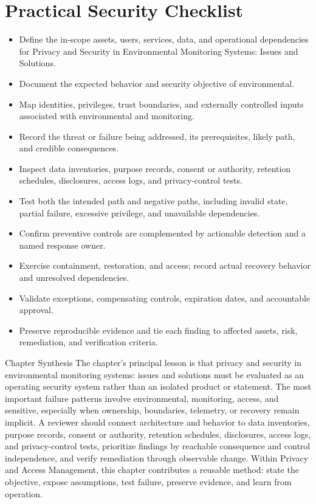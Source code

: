 \documentclass[11pt,letterpaper]{article}
\begin{document}
\section*{Practical Security Checklist}
\begin{itemize}[label=$\square$]
\item Define the in-scope assets, users, services, data, and operational dependencies for Privacy and Security in Environmental Monitoring Systems: Issues and Solutions.
\item Document the expected behavior and security objective of environmental.
\item Map identities, privileges, trust boundaries, and externally controlled inputs associated with environmental and monitoring.
\item Record the threat or failure being addressed, its prerequisites, likely path, and credible consequences.
\item Inspect data inventories, purpose records, consent or authority, retention schedules, disclosures, access logs, and privacy-control tests.
\item Test both the intended path and negative paths, including invalid state, partial failure, excessive privilege, and unavailable dependencies.
\item Confirm preventive controls are complemented by actionable detection and a named response owner.
\item Exercise containment, restoration, and access; record actual recovery behavior and unresolved dependencies.
\item Validate exceptions, compensating controls, expiration dates, and accountable approval.
\item Preserve reproducible evidence and tie each finding to affected assets, risk, remediation, and verification criteria.
\end{itemize}
\begin{CornellSummaryBox}{Chapter Synthesis}
The chapter's principal lesson is that privacy and security in environmental monitoring systems: issues and solutions must be evaluated as an operating security system rather than an isolated product or statement. The most important failure patterns involve environmental, monitoring, access, and sensitive, especially when ownership, boundaries, telemetry, or recovery remain implicit. A reviewer should connect architecture and behavior to data inventories, purpose records, consent or authority, retention schedules, disclosures, access logs, and privacy-control tests, prioritize findings by reachable consequence and control independence, and verify remediation through observable change. Within Privacy and Access Management, this chapter contributes a reusable method: state the objective, expose assumptions, test failure, preserve evidence, and learn from operation.
\end{CornellSummaryBox}
\end{document}
